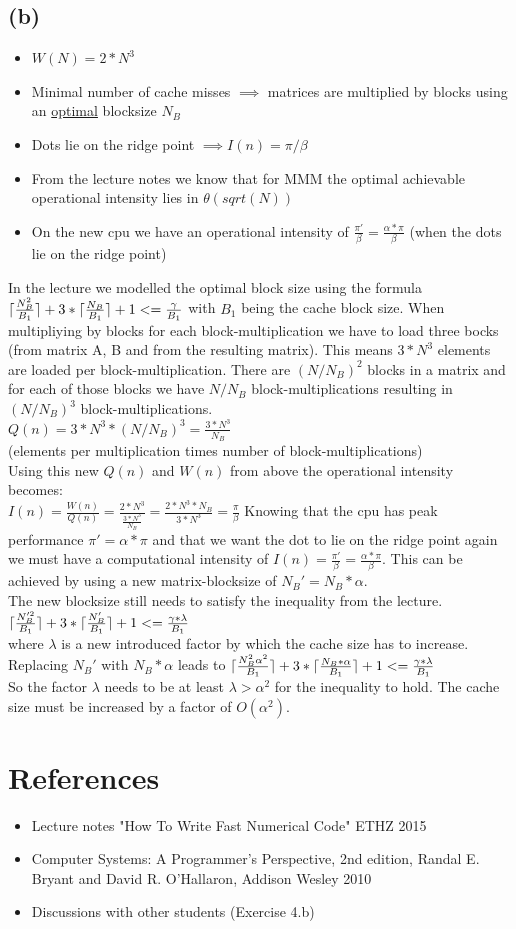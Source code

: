 \documentclass[10pt,a4paper,oneside,notitlepage]{report}
\DeclarePairedDelimiter{\ceil}{\lceil}{\rceil}
\begin{document}
\subsection*{(b)}
\begin{itemize}
\item $W(N) = 2*N^3$
\item Minimal number of cache misses $\implies$ matrices are multiplied by blocks using an \underline{optimal} blocksize $N_B$ 
\item Dots lie on the ridge point $\implies I(n) = \pi/\beta$ 
\item From the lecture notes we know that for MMM the optimal achievable operational intensity lies in $\theta(sqrt(N))$
\item On the new cpu we have an operational intensity of $\frac{\pi'}{\beta}=\frac{\alpha*\pi}{\beta}$ (when the dots lie on the ridge point)
\end{itemize}
In the lecture we modelled the optimal block size using the formula $\ceil{\frac{N_B^2}{B_1}} + 3*\ceil{\frac{N_B}{B_1}} + 1 <= \frac{\gamma}{B_1}$ with $B_1$ being the cache block size. When multipliying by blocks for each block-multiplication we have to load three bocks (from matrix A, B and from the resulting matrix). This means $3*N^3$ elements are loaded per block-multiplication. There are $(N/N_B)^2$ blocks in a matrix and for each of those blocks we have $N/N_B$ block-multiplications resulting in $(N/N_B)^3$ block-multiplications.\\
$Q(n)={3*N^3 * (N/N_B)^3}=\frac{3*N^3}{N_B}$ \\ (elements per multiplication times number of block-multiplications) \\
Using this new $Q(n)$ and $W(n)$ from above the operational intensity becomes: \\ $I(n)=\frac{W(n)}{Q(n)}=\frac{2*N^3}{\frac{3*N^3}{N_B}} = \frac{2*N^3*N_B}{3*N^3} =\frac{\pi}{\beta}$
Knowing that the cpu has peak performance $\pi'=\alpha*\pi$ and that we want the dot to lie on the ridge point again we must have a computational intensity of $I(n)=\frac{\pi'}{\beta} = \frac{\alpha*\pi}{\beta}$. This can be achieved by using a new matrix-blocksize of $N_B'=N_B*\alpha$. \\
The new blocksize still needs to satisfy the inequality from the lecture. \\
$\ceil{\frac{N_B'^2}{B_1}} + 3*\ceil{\frac{N_B'}{B_1}} + 1 <= \frac{\gamma*\lambda}{B_1}$ \\
where $\lambda$ is a new introduced factor by which the cache size has to increase. \\
Replacing $N_B'$ with $N_B*\alpha$ leads to
$\ceil{\frac{N_B^2\alpha^2}{B_1}} + 3*\ceil{\frac{N_B*\alpha}{B_1}} + 1 <= \frac{\gamma*\lambda}{B_1}$ \\
So the factor $\lambda$ needs to be at least $\lambda>\alpha^2$ for the inequality to hold. The cache size must be increased by a factor of $O(\alpha^2)$.
\newpage
\section*{References}
\begin{itemize}
\item Lecture notes "How To Write Fast Numerical Code" ETHZ 2015
\item Computer Systems: A Programmer's Perspective, 2nd edition,
Randal E. Bryant and David R. O'Hallaron, Addison Wesley 2010
\item Discussions with other students (Exercise 4.b)
\end{itemize}
\end{document}
